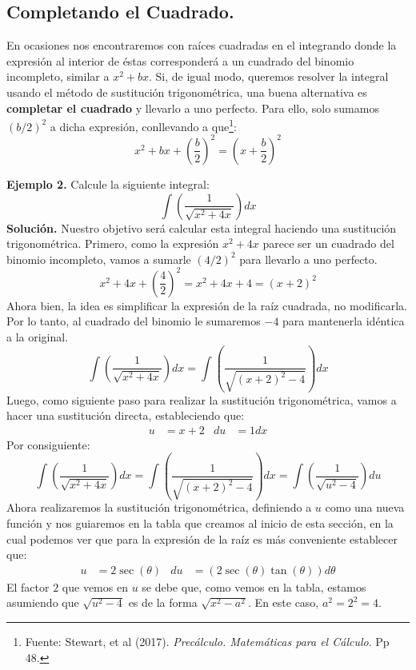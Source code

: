 \documentclass[12pt]{article}
\begin{document}
\subsection{Completando el Cuadrado.}

En ocasiones nos encontraremos con raíces cuadradas en el integrando donde la expresión al interior de éstas corresponderá a un cuadrado del binomio incompleto, similar a $x^{2} + bx$. Si, de igual modo, queremos resolver la integral usando el método de sustitución trigonométrica, una buena alternativa es \textbf{completar el cuadrado} y llevarlo a uno perfecto. Para ello, solo sumamos $(b/2)^{2}$ a dicha expresión, conllevando a que\footnote{Fuente: Stewart, et al (2017). \textit{Precálculo. Matemáticas para el Cálculo}. Pp 48.}:
\[
  x^{2} + bx + \left(\frac{b}{2}\right)^{2} = \left(x + \frac{b}{2}\right)^{2}
\]

\textbf{Ejemplo 2.} Calcule la siguiente integral:
\[
  \int \left(\frac{1}{\sqrt{x^{2} + 4x}}\right) dx
\]
\textbf{Solución.} Nuestro objetivo será calcular esta integral haciendo una sustitución trigonométrica. Primero, como la expresión $x^{2} + 4x$ parece ser un cuadrado del binomio incompleto, vamos a sumarle $(4/2)^{2}$ para llevarlo a uno perfecto.
\[
  x^{2} + 4x + \left(\frac{4}{2}\right)^{2} = x^{2} + 4x + 4 = (x + 2)^{2}
\]
Ahora bien, la idea es simplificar la expresión de la raíz cuadrada, no modificarla. Por lo tanto, al cuadrado del binomio le sumaremos $-4$ para mantenerla idéntica a la original.
\[
  \int \left(\frac{1}{\sqrt{x^{2} + 4x}}\right) dx = \int \left(\frac{1}{\sqrt{(x + 2)^{2} - 4}}\right) dx
\]
Luego, como siguiente paso para realizar la sustitución trigonométrica, vamos a hacer una sustitución directa, estableciendo que:
\begin{align*}
  u &= x + 2 & du &= 1dx
\end{align*}
Por consiguiente:
\[
  \int \left(\frac{1}{\sqrt{x^{2} + 4x}}\right) dx = \int \left(\frac{1}{\sqrt{(x + 2)^{2} - 4}}\right) dx
                                                   = \int \left(\frac{1}{\sqrt{u^{2} - 4}}\right) du
\]
Ahora realizaremos la sustitución trigonométrica, definiendo a $u$ como una nueva función y nos guiaremos en la tabla que creamos al inicio de esta sección, en la cual podemos ver que para la expresión de la raíz es más conveniente establecer que:
\begin{align*}
  u &= 2\sec(\theta) & du &= (2\sec(\theta)\tan(\theta)) d\theta
\end{align*}
El factor $2$ que vemos en $u$ se debe que, como vemos en la tabla, estamos asumiendo que $\sqrt{u^{2} - 4}$ es de la forma $\sqrt{x^{2} - a^{2}}$. En este caso, $a^{2} = 2^{2} = 4$.
\end{document}
